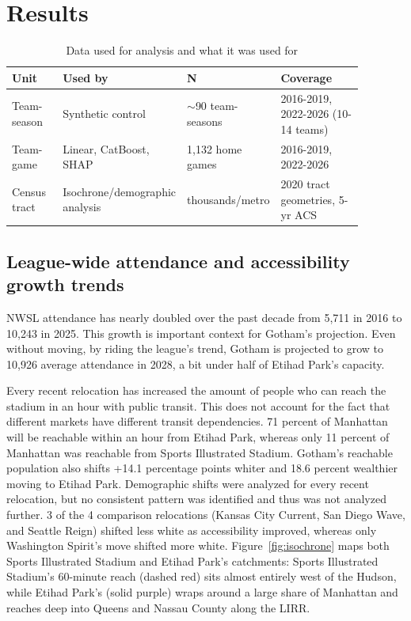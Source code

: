 \documentclass[9pt,twoside]{pnas-new}
\begin{document}
\section{Results}
\begin{table}[h!]
\centering
\caption{Data used for analysis and what it was used for}
\begin{tabular}{@{}p{0.16\linewidth}p{0.28\linewidth}p{0.16\linewidth}p{0.28\linewidth}@{}}
\toprule
Unit & Used by & N & Coverage \\
\midrule
Team-season & Synthetic control & $\sim$90 team-seasons & 2016-2019, 2022-2026 (10-14 teams) \\
Team-game & Linear, CatBoost, SHAP & 1,132 home games & 2016-2019, 2022-2026 \\
Census tract & Isochrone/demographic analysis & thousands/metro & 2020 tract geometries, 5-yr ACS \\
\bottomrule
\end{tabular}
\end{table}


\subsection{League-wide attendance and accessibility growth trends} 
NWSL attendance has nearly doubled over the past decade from 5,711 in 2016 to 10,243 in 2025. This growth is important context for Gotham's projection. Even without moving, by riding the league's trend, Gotham is projected to grow to 10,926 average attendance in 2028, a bit under half of Etihad Park's capacity.

Every recent relocation has increased the amount of people who can reach the stadium in an hour with public transit. This does not account for the fact that different markets have different transit dependencies. 71 percent of Manhattan will be reachable within an hour from Etihad Park, whereas only 11 percent of Manhattan was reachable from Sports Illustrated Stadium. Gotham's reachable population also shifts +14.1 percentage points whiter and 18.6 percent wealthier moving to Etihad Park. Demographic shifts were analyzed for every recent relocation, but no consistent pattern was identified and thus was not analyzed further. 3 of the 4 comparison relocations (Kansas City Current, San Diego Wave, and Seattle Reign) shifted less white as accessibility improved, whereas only Washington Spirit's move shifted more white. Figure~\ref{fig:isochrone} maps both Sports Illustrated Stadium and Etihad Park's catchments: Sports Illustrated Stadium's 60-minute reach (dashed red) sits almost entirely west of the Hudson, while Etihad Park's (solid purple) wraps around a large share of Manhattan and reaches deep into Queens and Nassau County along the LIRR.
\end{document}

